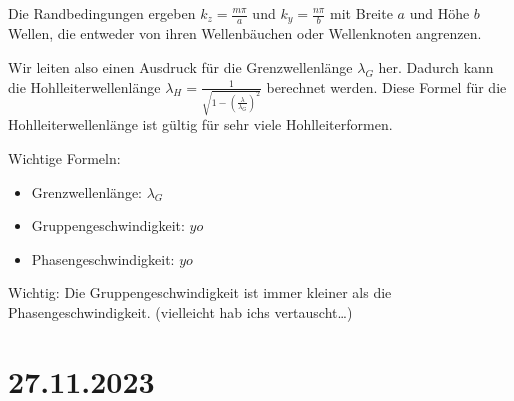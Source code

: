\documentclass[a4paper]{article}
\begin{document}
Die Randbedingungen ergeben $k_{z}=\frac{m\pi}{a}$ und $k_{y}=\frac{n\pi}{b}$ mit Breite $a$ und Höhe $b$ Wellen, die entweder von ihren Wellenbäuchen oder Wellenknoten angrenzen.

Wir leiten also einen Ausdruck für die Grenzwellenlänge $\lambda_{G}$ her. Dadurch kann die Hohlleiterwellenlänge $\lambda_{H}=\frac{1}{\sqrt{1-(\frac{\lambda}{\lambda_{G}})^{2}} }$ berechnet werden. Diese Formel für die Hohlleiterwellenlänge ist gültig für sehr viele Hohlleiterformen.

Wichtige Formeln:
\begin{itemize}
    \item Grenzwellenlänge: $\lambda_{G}$
    \item Gruppengeschwindigkeit: $yo$
    \item Phasengeschwindigkeit:  $yo$
\end{itemize}
Wichtig: Die Gruppengeschwindigkeit ist immer kleiner als die Phasengeschwindigkeit. (vielleicht hab ichs vertauscht\ldots )

\section*{27.11.2023}
\end{document}
